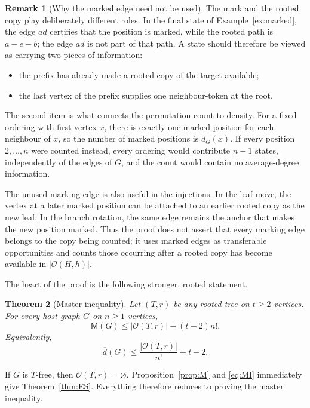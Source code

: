 \documentclass[11pt]{article}
\numberwithin{equation}{section}
\newtheorem{theorem}{Theorem}[section]
\theoremstyle{definition}
\newtheorem{remark}[theorem]{Remark}
\newcommand{\cO}{\mathcal O}
\newcommand{\Mcnt}{\mathsf M}
\newcommand{\avgdeg}{\overline d}
\begin{document}
\begin{remark}[Why the marked edge need not be used]
The mark and the rooted copy play deliberately different roles.  In the
final state of Example~\ref{ex:marked}, the edge $ad$ certifies that the
position is marked, while the rooted path is $a-e-b$; the edge $ad$ is not
part of that path.  A state should therefore be viewed as carrying two
pieces of information:
\begin{itemize}
\item the prefix has already made a rooted copy of the target available;
\item the last vertex of the prefix supplies one neighbour-token at the
      root.
\end{itemize}
The second item is what connects the permutation count to density.  For a
fixed ordering with first vertex $x$, there is exactly one marked position for
each neighbour of $x$, so the number of marked positions is $d_G(x)$.  If
every position $2,\ldots,n$ were counted instead, every ordering would
contribute $n-1$ states, independently of the edges of $G$, and the count
would contain no average-degree information.

The unused marking edge is also useful in the injections.  In the leaf move,
the vertex at a later marked position can be attached to an earlier rooted
copy as the new leaf.  In the branch rotation, the same edge remains the
anchor that makes the new position marked.  Thus the proof does not assert
that every marking edge belongs to the copy being counted; it uses marked
edges as transferable opportunities and counts those occurring after a
rooted copy has become available in $|\cO(H,h)|$.
\end{remark}

The heart of the proof is the following stronger, rooted statement.

\begin{theorem}[Master inequality]\label{thm:master}
Let $(T,r)$ be any rooted tree on $t\geq2$ vertices.  For every host graph
$G$ on $n\geq1$ vertices,
\begin{equation}
        \Mcnt(G)\leq|\cO(T,r)|+(t-2)n!.
        \tag{MI}\label{eq:MI}
\end{equation}
Equivalently,
\[
        \avgdeg(G)\leq\frac{|\cO(T,r)|}{n!}+t-2.
\]
\end{theorem}

If $G$ is $T$-free, then $\cO(T,r)=\varnothing$.  Proposition~\ref{prop:M} and
\eqref{eq:MI} immediately give Theorem~\ref{thm:ES}.  Everything therefore
reduces to proving the master inequality.
\end{document}
